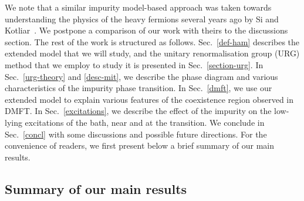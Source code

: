\documentclass{iopart}
\begin{document}
We note that a similar impurity model-based approach was taken towards understanding the physics of the heavy fermions several years ago by Si and Kotliar~\cite{si_kotliar_1993,kotliarsi_1993}. 
We postpone a comparison of our work with theirs to the discussions section. The rest of the work is structured as follows. Sec.~\eqref{def-ham} describes the extended model that we will study, and the unitary renormalisation group (URG) method that we employ to study it is presented in Sec.~\eqref{section-urg}. In Sec.~\eqref{urg-theory} and \eqref{desc-mit}, we describe the phase diagram and various characteristics of the impurity phase transition. In Sec.~\eqref{dmft}, we use our extended model to explain various features of the coexistence region observed in DMFT. In Sec.~\eqref{excitations}, we describe the effect of the impurity on the low-lying excitations of the bath, near and at the transition. We conclude in Sec.~\eqref{concl} with some discussions and possible future directions. For the convenience of readers, we first present below a brief summary of our main results.

\subsection*{\bf Summary of our main results}
\end{document}
